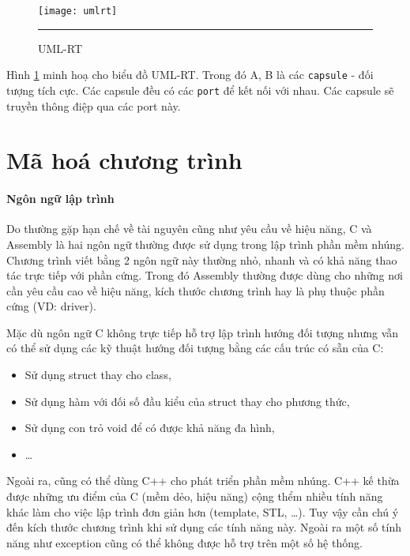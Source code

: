                 \begin{figure}[H]
                    \centering
                    \texttt{[image: umlrt]}
                    \rule{35em}{0.5pt}
                    \caption{UML-RT}
                    \label{fig:umlrt}
                \end{figure}

                Hình \ref{fig:umlrt} minh hoạ cho biểu đồ UML-RT. Trong đó A, B
                là các \texttt{capsule} - đối tượng tích cực. Các capsule đều
                có các \texttt{port} để kết nối với nhau. Các capsule sẽ truyền
                thông điệp qua các port này.
                
    \section{Mã hoá chương trình}
        \paragraph{Ngôn ngữ lập trình}
            Do thường gặp hạn chế về tài nguyên cũng như yêu cầu về hiệu năng,
            C và Assembly là hai ngôn ngữ thường được sử dụng trong lập trình
            phần mềm nhúng. Chương trình viết bằng 2 ngôn ngữ này thường nhỏ,
            nhanh và có khả năng thao tác trực tiếp với phần cứng. Trong đó
            Assembly thường được dùng cho những nơi cần yêu cầu cao về hiệu
            năng, kích thước chương trình hay là phụ thuộc phần cứng (VD:
            driver).

            Mặc dù ngôn ngữ C không trực tiếp hỗ trợ lập trình hướng đối tượng
            nhưng vẫn có thể sử dụng các kỹ thuật hướng đối tượng bằng các cấu
            trúc có sẵn của C:
            \begin{itemize}
                \item Sử dụng struct thay cho class,
                \item Sử dụng hàm với đối số đầu kiểu của struct thay
                    cho phương thức,
                \item Sử dụng con trỏ void để có được khả năng đa hình,
                \item \ldots
            \end{itemize}


            Ngoài ra, cũng có thể dùng C++ cho phát triển phần mềm nhúng. C++
            kế thừa được những ưu điểm của C (mềm dẻo, hiệu năng) cộng thểm
            nhiều tính năng khác làm cho việc lập trình đơn giản hơn (template,
            STL, \ldots). Tuy vậy cần chú ý đến kích thước chương trình khi sử
            dụng các tính năng này. Ngoài ra một số tính năng như exception
            cũng có thể không được hỗ trợ trên một số hệ thống.

